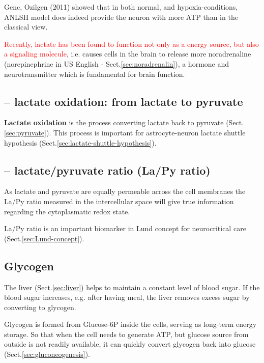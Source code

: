 Genc, Ozilgen (2011) showed that in both normal, and hypoxia-conditions, ANLSH
model does indeed provide the neuron with more ATP than in the classical view.


\textcolor{red}{Recently, lactate has been found to function not only as a
energy source, but also a signaling molecule}, i.e.
causes cells in the brain to release more noradrenaline (norepinephrine in US
English - Sect.\ref{sec:noradrenalin}), a hormone and neurotransmitter
which is fundamental for brain function.

\subsection{-- lactate oxidation: from lactate to pyruvate}
\label{sec:lactate-oxidation}

{\bf Lactate oxidation} is the process converting lactate back to pyruvate
(Sect.\ref{sec:pyruvate}). This process is important for astrocyte-neuron
lactate shuttle hypothesis (Sect.\ref{sec:lactate-shuttle-hypothesis}).

\subsection{-- lactate/pyruvate ratio (La/Py ratio)}
\label{sec:lactate-pyruvate-ratio}


As lactate and pyruvate are equally permeable across the cell membranes the
La/Py ratio measured in the intercellular space will give true information
regarding the cytoplasmatic redox state.

La/Py ratio is an important biomarker in Lund concept for neurocritical care
(Sect.\ref{sec:Lund-concept}).


\subsection{Glycogen}
\label{sec:glycogen}

The liver (Sect.\ref{sec:liver}) helps to maintain a constant level of blood
sugar. If the blood sugar increases, e.g. after having meal, the liver removes
excess sugar by converting to glycogen. 

Glycogen is formed from Glucose-6P inside the cells, serving as long-term energy
storage. So that when the cell needs to generate ATP, but glucose source from
outside is not readily available, it can quickly convert glycogen back into
glucose (Sect.\ref{sec:gluconeogenesis}).

